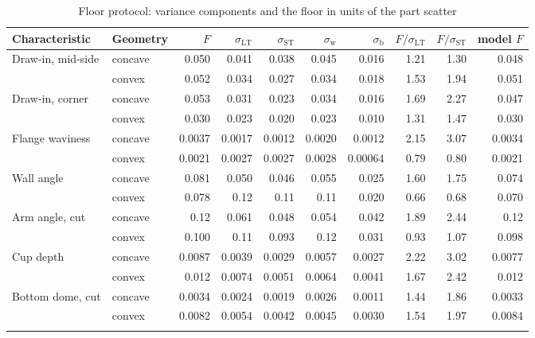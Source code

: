 \documentclass[pdflatex,sn-basic]{sn-jnl}
\newcommand{\tabsize}{\fontsize{8}{9.5}\selectfont}
\begin{document}
\begin{table}[tbp]
\tabsize
\setlength{\tabcolsep}{3pt}
\caption{Floor protocol: variance components and the floor in units of the part scatter}\label{tab:protocol}
\begin{tabular}{@{}llrrrrrrrr@{}}
\toprule
Characteristic & Geometry & $F$ & $\sigma_\mathrm{LT}$ & $\sigma_\mathrm{ST}$ & $\sigma_\mathrm{w}$ & $\sigma_\mathrm{b}$ & $F/\sigma_\mathrm{LT}$ & $F/\sigma_\mathrm{ST}$ & model $F$ \\
\midrule
Draw-in, mid-side & concave & 0.050 & 0.041 & 0.038 & 0.045 & 0.016 & 1.21 & 1.30 & 0.048 \\
 & convex & 0.052 & 0.034 & 0.027 & 0.034 & 0.018 & 1.53 & 1.94 & 0.051 \\
Draw-in, corner & concave & 0.053 & 0.031 & 0.023 & 0.034 & 0.016 & 1.69 & 2.27 & 0.047 \\
 & convex & 0.030 & 0.023 & 0.020 & 0.023 & 0.010 & 1.31 & 1.47 & 0.030 \\
Flange waviness & concave & 0.0037 & 0.0017 & 0.0012 & 0.0020 & 0.0012 & 2.15 & 3.07 & 0.0034 \\
 & convex & 0.0021 & 0.0027 & 0.0027 & 0.0028 & 0.00064 & 0.79 & 0.80 & 0.0021 \\
Wall angle & concave & 0.081 & 0.050 & 0.046 & 0.055 & 0.025 & 1.60 & 1.75 & 0.074 \\
 & convex & 0.078 & 0.12 & 0.11 & 0.11 & 0.020 & 0.66 & 0.68 & 0.070 \\
Arm angle, cut & concave & 0.12 & 0.061 & 0.048 & 0.054 & 0.042 & 1.89 & 2.44 & 0.12 \\
 & convex & 0.100 & 0.11 & 0.093 & 0.12 & 0.031 & 0.93 & 1.07 & 0.098 \\
Cup depth & concave & 0.0087 & 0.0039 & 0.0029 & 0.0057 & 0.0027 & 2.22 & 3.02 & 0.0077 \\
 & convex & 0.012 & 0.0074 & 0.0051 & 0.0064 & 0.0041 & 1.67 & 2.42 & 0.012 \\
Bottom dome, cut & concave & 0.0034 & 0.0024 & 0.0019 & 0.0026 & 0.0011 & 1.44 & 1.86 & 0.0033 \\
 & convex & 0.0082 & 0.0054 & 0.0042 & 0.0045 & 0.0030 & 1.54 & 1.97 & 0.0084 \\
\botrule
\end{tabular}
\end{table}
\end{document}
